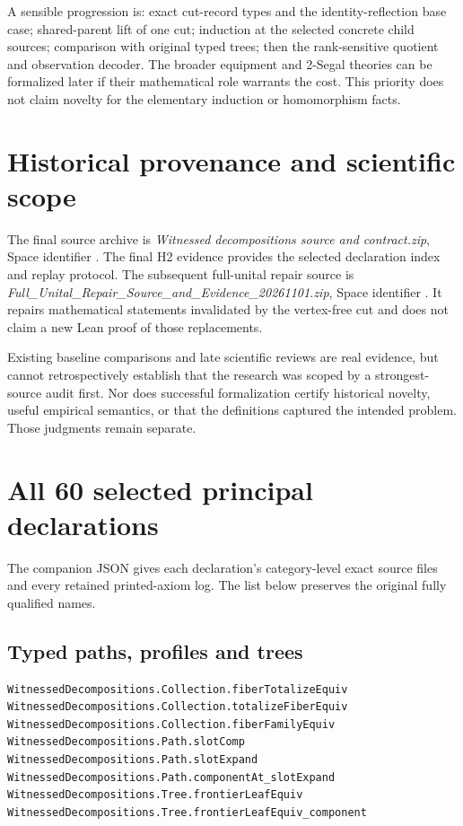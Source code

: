 \documentclass[11pt]{article}
\begin{document}
A sensible progression is: exact cut-record types and the identity-reflection base case; shared-parent lift of one cut; induction at the selected concrete child sources; comparison with original typed trees; then the rank-sensitive quotient and observation decoder. The broader equipment and 2-Segal theories can be formalized later if their mathematical role warrants the cost. This priority does not claim novelty for the elementary induction or homomorphism facts.

\section{Historical provenance and scientific scope}
The final source archive is \emph{Witnessed decompositions source and contract.zip}, Space identifier \texttt{}. The final H2 evidence provides the selected declaration index and replay protocol. The subsequent full-unital repair source is \emph{Full\_Unital\_Repair\_Source\_and\_Evidence\_20261101.zip}, Space identifier \texttt{}. It repairs mathematical statements invalidated by the vertex-free cut and does not claim a new Lean proof of those replacements.

Existing baseline comparisons and late scientific reviews are real evidence, but cannot retrospectively establish that the research was scoped by a strongest-source audit first. Nor does successful formalization certify historical novelty, useful empirical semantics, or that the definitions captured the intended problem. Those judgments remain separate.

\appendix\section{All 60 selected principal declarations}
The companion JSON gives each declaration's category-level exact source files and every retained printed-axiom log. The list below preserves the original fully qualified names.
\subsection{Typed paths, profiles and trees}
\begin{verbatim}
WitnessedDecompositions.Collection.fiberTotalizeEquiv
WitnessedDecompositions.Collection.totalizeFiberEquiv
WitnessedDecompositions.Collection.fiberFamilyEquiv
WitnessedDecompositions.Path.slotComp
WitnessedDecompositions.Path.slotExpand
WitnessedDecompositions.Path.componentAt_slotExpand
WitnessedDecompositions.Tree.frontierLeafEquiv
WitnessedDecompositions.Tree.frontierLeafEquiv_component
\end{verbatim}
\end{document}
